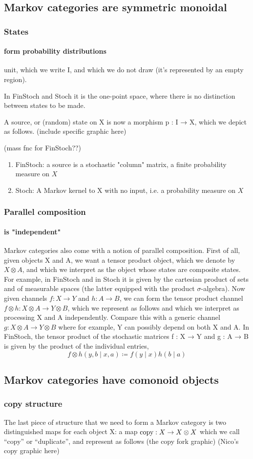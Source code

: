 \subsection{Markov categories are symmetric monoidal}
\begin{frame}
    \frametitle{States}
    \framesubtitle{form probability distributions}
unit, which we write I, and which we do not draw (it’s represented by an empty region). 

In FinStoch and Stoch it is the one-point space, where there is no distinction between states to be made.

A source, or (random) state on X is now a morphism p : I → X, which we depict as follows. (include specific graphic here)

(mass fnc for FinStoch??)
\begin{enumerate}
    \item FinStoch: a source is a stochastic "column" matrix, a finite probability measure on $X$
    \item Stoch: A Markov kernel to X with no input, i.e. a probability measure on $X$
\end{enumerate}

\end{frame}

\begin{frame}
    \frametitle{Parallel composition} 
    \framesubtitle{is "independent"}
Markov categories also come with a notion of parallel composition. First of all, given objects X and A, we want a tensor product object, which we denote by $X\otimes A$, and which we interpret as the object whose states are composite states. For example, in FinStoch and in Stoch it is given by the cartesian product of sets and of measurable spaces (the latter equipped with the product $\sigma$-algebra). Now given channels $f: X\to Y$ and $h: A\to B$, we can form the tensor product channel $f\otimes h: X\otimes A\to Y\otimes B$, which we represent as follows
and which we interpret as processing X and A independently. Compare this with a generic channel $g: X\otimes A\to Y\otimes B$
where for example, Y can possibly depend on both X and A. In FinStoch, the tensor product of the stochastic matrices f : X → Y and g : A → B is given by the product of the individual entries,
\[
    f\otimes h(y, b\mid x, a)\coloneqq f(y\mid x)h(b\mid a)
\]
\end{frame}

\subsection{Markov categories have comonoid objects}
\begin{frame}
    \frametitle{copy structure}
The last piece of structure that we need to form a Markov category is two distinguished maps for each object X: a map $\text{\normalfont copy}: X\to X\otimes X$ which we call “copy” or “duplicate”, and represent as follows
(the copy fork graphic)
(Nico's copy graphic here)
\end{frame}


